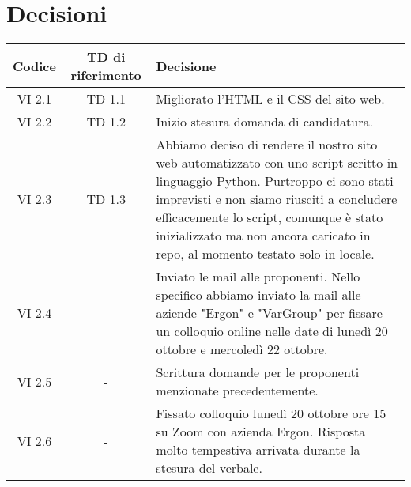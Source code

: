 \section{Decisioni}

	\begin{table}[htbp]
		\begin{tabular}{|c|c|p{}|}
			\hline
			\rowcolor[gray]{0.9}
			Codice & TD di riferimento & Decisione \\
			\hline
			VI 2.1 & TD 1.1 & Migliorato l'HTML e il CSS del sito web. \\
			\hline
			VI 2.2 & TD 1.2 & Inizio stesura domanda di candidatura. \\
			\hline
			VI 2.3 & TD 1.3 & Abbiamo deciso di rendere il nostro sito web automatizzato con uno script scritto in linguaggio Python. Purtroppo ci sono stati imprevisti e non siamo riusciti a concludere efficacemente lo script, comunque è stato inizializzato ma non ancora caricato in repo, al momento testato solo in locale. \\
			\hline
			VI 2.4 & - & Inviato le mail alle proponenti. Nello specifico abbiamo inviato la mail alle aziende "Ergon" e "VarGroup" per fissare un colloquio online nelle date di lunedì 20 ottobre e mercoledì 22 ottobre. \\
			\hline
			VI 2.5 & - & Scrittura domande per le proponenti menzionate precedentemente. \\
			\hline
			VI 2.6 & - & Fissato colloquio lunedì 20 ottobre ore 15 su Zoom con azienda Ergon. Risposta molto tempestiva arrivata durante la stesura del verbale. \\
			\hline
		\end{tabular}
	\end{table}